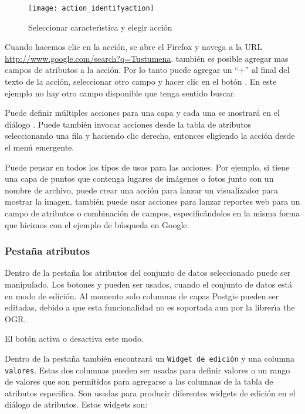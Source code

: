 \begin{figure}[H]
   \begin{center}
   \caption{Seleccionar caracter\'{\i}stica y elegir acci\'on \nixcaption}\label{fig:identify_action}\smallskip
   \texttt{[image: action\_identifyaction]} 
\end{center}  
\end{figure}

Cuando hacemos clic en la acci\'on, se abre el Firefox y navega a la URL
\url{http://www.google.com/search?q=Tustumena}. también es posible agregar mas 
campos de atributos a la acci\'on. Por lo tanto puede agregar un ``+'' al final del texto de la acci\'on, 
seleccionar otro campo y hacer clic en el bot\'on . En este ejemplo no
hay otro campo disponible que tenga sentido buscar.

Puede definir m\'ultiples acciones para una capa y cada una se mostrar\'a en el
di\'alogo . Puede también invocar acciones desde la tabla de atributos
seleccionando una fila y haciendo clic derecho, entonces eligiendo la acci\'on desde el men\'u
emergente.

Puede pensar en todos los tipos de usos para las acciones. Por ejemplo, si tiene una capa de puntos
que contenga lugares de im\'agenes o fotos junto con un nombre de archivo, puede
crear una acci\'on para lanzar un visualizador para mostrar la imagen. también puede usar
acciones para lanzar reportes web para un campo de atributos o combinaci\'on de
campos, especific\'andolos en la misma forma que hicimos con el ejemplo de b\'usqueda en Google.

\subsubsection{Pesta\~na atributos}\label{label_attributes}
Dentro de la pesta\~na  los atributos del conjunto de datos seleccionado puede ser manipulado.
Los botones  y  pueden ser usados,
cuando el conjunto de datos est\'a en modo de edici\'on. Al momento solo columnas
de capas Postgis pueden ser editadas, debido a que esta funcionalidad no es soportada aun 
por la librer\'{\i}a the OGR. 

El bot\'on  activa o desactiva este modo.


Dentro de la pesta\~na  también encontrar\'a un \texttt{Widget de edici\'on} y una columna 
\texttt{valores}. Estas dos columnas pueden ser usadas para definir valores o un rango 
de valores que son permitidos para agregarse a las columnas de la tabla de atributos especifica. 
Son usadas para producir diferentes widgets de edici\'on en el di\'alogo de atributos. Estos 
widgets son:

